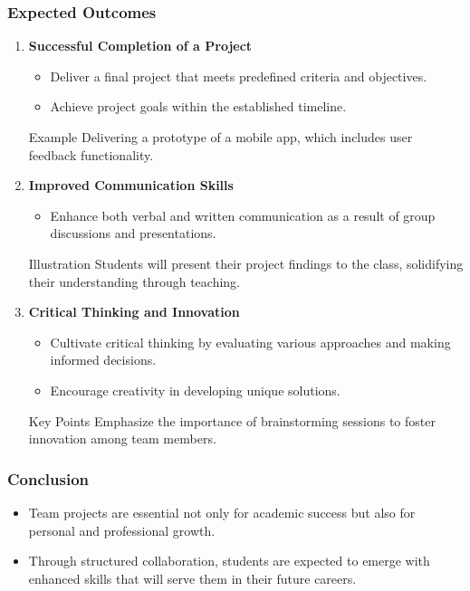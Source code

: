 \documentclass[aspectratio=169]{beamer}
\begin{document}
\begin{frame}[fragile]
    \frametitle{Expected Outcomes}
    \begin{enumerate}
        \item \textbf{Successful Completion of a Project}
        \begin{itemize}
            \item Deliver a final project that meets predefined criteria and objectives.
            \item Achieve project goals within the established timeline.
        \end{itemize}
        \begin{block}{Example}
            Delivering a prototype of a mobile app, which includes user feedback functionality.
        \end{block}

        \item \textbf{Improved Communication Skills}
        \begin{itemize}
            \item Enhance both verbal and written communication as a result of group discussions and presentations.
        \end{itemize}
        \begin{block}{Illustration}
            Students will present their project findings to the class, solidifying their understanding through teaching.
        \end{block}

        \item \textbf{Critical Thinking and Innovation}
        \begin{itemize}
            \item Cultivate critical thinking by evaluating various approaches and making informed decisions.
            \item Encourage creativity in developing unique solutions.
        \end{itemize}
        \begin{block}{Key Points}
            Emphasize the importance of brainstorming sessions to foster innovation among team members.
        \end{block}
    \end{enumerate}
\end{frame}

\begin{frame}[fragile]
    \frametitle{Conclusion}
    \begin{itemize}
        \item Team projects are essential not only for academic success but also for personal and professional growth.
        \item Through structured collaboration, students are expected to emerge with enhanced skills that will serve them in their future careers.
    \end{itemize}
\end{frame}
\end{document}
